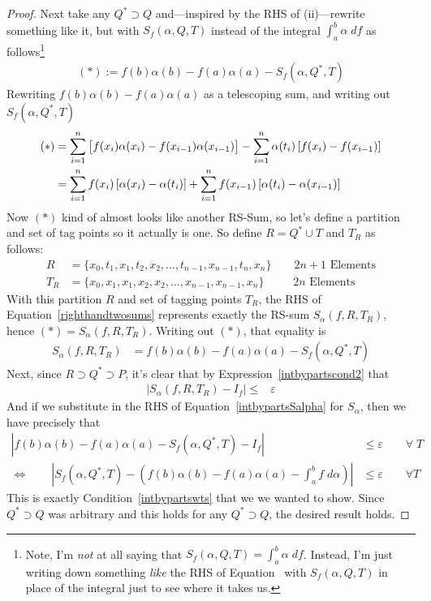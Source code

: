 \documentclass[12pt]{book}
\numberwithin{equation}{section} %
\theoremstyle{plain}
\theoremstyle{definition}
\theoremstyle{remark}
\begin{document}
\begin{proof}
Next take any $Q^*\supset Q$ and---inspired by the RHS of (ii)---rewrite
something like it, but with $S_f(\alpha,Q,T)$ instead of the integral
$\int^b_a \alpha \; df$ as follows\footnote{%
  Note, I'm \emph{not} at all saying that
  $S_f(\alpha,Q,T)=\int^b_a\alpha\;df$.
  Instead, I'm just writing down something \emph{like} the RHS of
  Equation~ with $S_f(\alpha,Q,T)$ in place of the
  integral just to see where it takes us.
}
\begin{align*}
  (*) :=
  f(b) \alpha(b) - f(a)\alpha(a) - S_f(\alpha,Q^*,T)
\end{align*}
Rewriting $f(b)\alpha(b)-f(a)\alpha(a)$ as a telescoping sum, and
writing out $S_f(\alpha,Q^*,T)$
\begin{align}
  (*)
    &= \sum^n_{i=1}
    \big[
    f(x_i) \alpha(x_i) - f(x_{i-1}) \alpha(x_{i-1})
    \big]
    - \sum^n_{i=1} \alpha(t_i) \left[f(x_i) - f(x_{i-1})
    \right]
  \notag\\
  &= \sum^n_{i=1} f(x_i) \left[\alpha(x_i) - \alpha(t_i) \right]
      +\sum^n_{i=1} f(x_{i-1}) \left[\alpha(t_i)
    - \alpha(x_{i-1})\right]\label{righthandtwosums}
\end{align}
Now $(*)$ kind of almost looks like another RS-Sum, so let's define a
partition and set of tag points so it actually is one. So define
$R=Q^*\cup T$ and $T_R$ as follows:
\begin{align*}
  R &= \{x_0,t_1,x_1,t_2,x_2,\ldots,t_{n-1},x_{n-1},t_n,x_n\}
  \qquad \text{$2n+1$ Elements}
  \\
  T_R &= \{ x_0, x_1, x_1, x_2, x_2,\ldots, x_{n-1},x_{n-1},x_n \}
  \qquad\;\; \text{$2n$ Elements}
\end{align*}
With this partition $R$ and set of tagging points $T_R$, the RHS of
Equation~\ref{righthandtwosums} represents exactly the RS-sum
$ S_\alpha(f, R, T_R)$, hence $(*)=S_\alpha(f,R,T_R)$.
Writing out $(*)$, that equality is
\begin{align}
    S_\alpha(f,R,T_R) &=
    f(b) \alpha(b) - f(a)\alpha(a) - S_f(\alpha,Q^*,T)
    \label{intbypartsSalpha}
\end{align}
Next, since $R\supset Q^* \supset P$, it's clear that by
Expression~\ref{intbypartscond2} that
\begin{align*}
  \left\lvert S_\alpha(f,R,T_R) - I_f \right\rvert \leq &\varepsilon
\end{align*}
And if we substitute in the RHS of Equation~\ref{intbypartsSalpha} for
$S_\alpha$, then we have precisely that
\begin{align*}
    \left\lvert f(b) \alpha(b) - f(a)\alpha(a)
    - S_f(\alpha,Q^*,T) -
    I_f
    \right\rvert
    &\leq
    \varepsilon \qquad \forall \; T
    \\
    \iff\qquad
    \left\lvert
    S_f(\alpha,Q^*,T)
    -
    \left(
    f(b) \alpha(b) - f(a)\alpha(a) - \int^b_a f\; d\alpha
    \right)
    \right\rvert
    &\leq
    \varepsilon
    \qquad\forall T
\end{align*}
This is exactly Condition~\ref{intbypartswts} that we we wanted to show.
Since $Q^*\supset Q$ was arbitrary and this holds for any
$Q^*\supset Q$, the desired result holds.
\end{proof}
\end{document}
